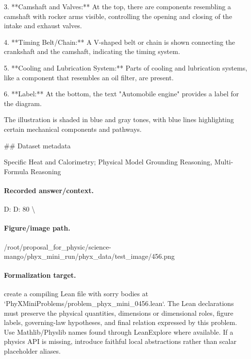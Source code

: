 3. **Camshaft and Valves:** At the top, there are components resembling a camshaft with rocker arms visible, controlling the opening and closing of the intake and exhaust valves.

4. **Timing Belt/Chain:** A V-shaped belt or chain is shown connecting the crankshaft and the camshaft, indicating the timing system.

5. **Cooling and Lubrication System:** Parts of cooling and lubrication systems, like a component that resembles an oil filter, are present.

6. **Label:** At the bottom, the text "Automobile engine" provides a label for the diagram.

The illustration is shaded in blue and gray tones, with blue lines highlighting certain mechanical components and pathways.

\#\# Dataset metadata

Specific Heat and Calorimetry; Physical Model Grounding Reasoning, Multi-Formula Reasoning

\paragraph{Recorded answer/context.}
D: D: 80 \textbackslash{}

\paragraph{Figure/image path.}
/root/proposal\_for\_physic/science-mango/phyx\_mini\_run/phyx\_data/test\_image/456.png

\paragraph{Formalization target.}
create a compiling Lean file with sorry bodies at `PhyXMiniProblems/problem\_phyx\_mini\_0456.lean`. The Lean declarations must preserve the physical quantities, dimensions or dimensional roles, figure labels, governing-law hypotheses, and final relation expressed by this problem.
Use Mathlib/Physlib names found through LeanExplore where available. If a physics API is missing, introduce faithful local abstractions rather than scalar placeholder aliases.


